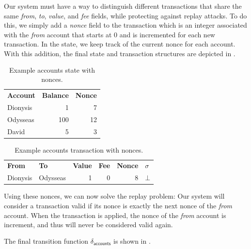 Our system must have a way to distinguish different transactions that share the same \emph{from}, \emph{to},
\emph{value}, and \emph{fee} fields, while protecting against replay attacks. To do this, we simply add a \emph{nonce}
field to the transaction which is an integer associated with the \emph{from} account that starts at $0$ and is incremented
for each new transaction. In the state, we keep track of the current nonce for each account. With this addition, the
final state and transaction structures are depicted in
.

\begin{table}[htbp!]
    \centering
    \begin{tabular}{|l|r|r|}
    \hline
    \textbf{Account} & \multicolumn{1}{l|}{\textbf{Balance}} & \multicolumn{1}{l|}{\textbf{Nonce}} \\ \hhline{|=|=|=|}
    Dionysis         & 1                                     & 7 \\ \hline
    Odysseas         & 100                                   & 12 \\ \hline
    David            & 5                                     & 3 \\ \hline
    \end{tabular}
    \caption{Example accounts state with nonces.}
    \label{tbl.accountsStateWithNonce}
\end{table}

\begin{table}[htbp!]
    \centering
    \begin{tabular}{|l|l|r|r|r|l|}
            \hline
            \textbf{From} & \textbf{To} & \textbf{Value} & \textbf{Fee} & \textbf{Nonce} & \textbf{$\sigma$} \\
            \hhline{|=|=|=|=|=|=|}
            Dionysis & Odysseas & 1 & 0 & 8 & $\bot$ \\
            \hline
    \end{tabular}
    \caption{Example accounts transaction with nonces.}
    \label{tbl.accountsTxWithNonce}
\end{table}

Using these nonces, we can now solve the replay problem:
Our system will consider a transaction valid if its nonce is exactly
the next nonce of the \emph{from} account. When the transaction is applied,
the nonce of the \emph{from} account is increment, and thus will never be
considered valid again.

The final transition function $\delta_\textsf{accounts}$ is shown in .

